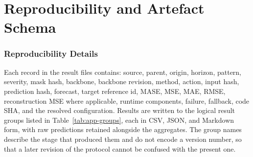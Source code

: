 \documentclass{article}
\begin{document}
\begin{table}[h]
  \caption{Backbone call accounting. Latency is reported per request and excludes cold start,
  which is reported on its own line. The offline replay-bank build and the one-off selector fit
  are amortised and reported separately. Candidate materialisation and scoring are booked on
  their own line and are not forecasting-backbone calls.}
  \label{tab:app-calls}
  \centering
  \small
  \setlength{\tabcolsep}{4pt}
\end{table}

\section{Reproducibility and Artefact Schema}
\label{app:repro-full}
\subsubsection{Reproducibility Details}
\label{app:reprodetails}
Each record in the result files contains: source, parent, origin, horizon, pattern,
severity, mask hash, backbone, backbone revision, method, action, input hash, prediction
hash, forecast, target reference id, MASE, MSE, MAE, RMSE, reconstruction MSE where
applicable, runtime components, failure, fallback, code SHA, and the resolved configuration.
Results are written to the logical result groups listed in Table~\ref{tab:app-groups}, each in
CSV, JSON, and Markdown form, with raw predictions retained alongside the aggregates. The
group names describe the stage that produced them and do not encode a version number, so that
a later revision of the protocol cannot be confused with the present one.
\end{document}
